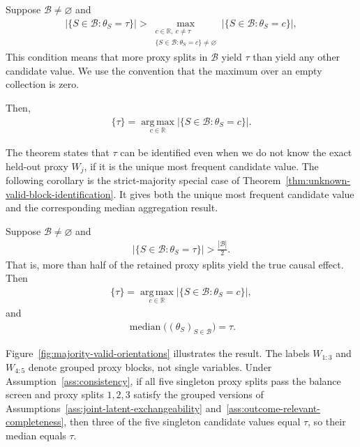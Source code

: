 \begin{theorem}
\label{thm:unknown-valid-block-identification}
	\normalfont
	Suppose $\mathcal B\neq\varnothing$ and
	\begin{align}
		\bigl|\{S\in\mathcal B:\theta_S=\tau\}\bigr|
		>
		\max_{\substack{c\in\mathbb R,\ c\ne\tau\\
		\{S\in\mathcal B:\theta_S=c\}\ne\varnothing}}
		\bigl|\{S\in\mathcal B:\theta_S=c\}\bigr|,
		\label{eq:unique-target-plurality}
	\end{align}
	This condition means that more proxy splits in $\mathcal B$ yield $\tau$ than yield any other candidate value. We use the convention that the maximum over an empty collection is zero.

	Then,
	\begin{align}
		\{\tau\}
		=
		\underset{c\in\mathbb R}{\operatorname{arg\,max}}
		\bigl|\{S\in\mathcal B:\theta_S=c\}\bigr|.
		\label{eq:exhaustive-plurality-identification}
	\end{align}
\end{theorem}
The theorem states that $\tau$ can be identified even when we do not know the exact held-out proxy $W_j$, if it is the unique most frequent candidate value. The following corollary is the strict-majority special case of Theorem~\ref{thm:unknown-valid-block-identification}. It gives both the unique most frequent candidate value and the corresponding median aggregation result.

\begin{corollary}
	\label{cor:target-majority-median}
	\normalfont
	Suppose $\mathcal B\neq\varnothing$ and
	\begin{align}
		\bigl|\{S\in\mathcal B:\theta_S=\tau\}\bigr|>\frac{|\mathcal B|}{2}.
		\label{eq:target-valued-majority}
	\end{align}
	That is, more than half of the retained proxy splits yield the true causal effect. Then
	\begin{align}
		\{\tau\}
		=
		\underset{c\in\mathbb R}{\operatorname{arg\,max}}
		\bigl|\{S\in\mathcal B:\theta_S=c\}\bigr|,
	\end{align}
	and
	\begin{align}
		\operatorname{median}\bigl((\theta_S)_{S\in\mathcal B}\bigr)=\tau.
	\end{align}
\end{corollary}

Figure~\ref{fig:majority-valid-orientations} illustrates the result. The labels $W_{1:3}$ and $W_{4:5}$ denote grouped proxy blocks, not single variables. Under Assumption~\ref{ass:consistency}, if all five singleton proxy splits pass the balance screen and proxy splits $1,2,3$ satisfy the grouped versions of Assumptions~\ref{ass:joint-latent-exchangeability} and~\ref{ass:outcome-relevant-completeness}, then three of the five singleton candidate values equal $\tau$, so their median equals $\tau$.

